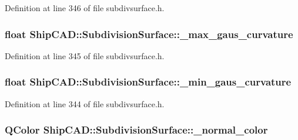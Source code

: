Definition at line 346 of file subdivsurface.\-h.

\hypertarget{classShipCAD_1_1SubdivisionSurface_a1658374385131656d359ff373d2cb08c}{
\subsubsection[{\-\_\-max\-\_\-gaus\-\_\-curvature}]{\setlength{\rightskip}{0pt plus 5cm}float Ship\-C\-A\-D\-::\-Subdivision\-Surface\-::\-\_\-max\-\_\-gaus\-\_\-curvature\hspace{0.3cm}{\ttfamily [protected]}}}\label{classShipCAD_1_1SubdivisionSurface_a1658374385131656d359ff373d2cb08c}


Definition at line 345 of file subdivsurface.\-h.

\hypertarget{classShipCAD_1_1SubdivisionSurface_ac343c30f7e4e6a5926fdfed7da3f9385}{
\subsubsection[{\-\_\-min\-\_\-gaus\-\_\-curvature}]{\setlength{\rightskip}{0pt plus 5cm}float Ship\-C\-A\-D\-::\-Subdivision\-Surface\-::\-\_\-min\-\_\-gaus\-\_\-curvature\hspace{0.3cm}{\ttfamily [protected]}}}\label{classShipCAD_1_1SubdivisionSurface_ac343c30f7e4e6a5926fdfed7da3f9385}


Definition at line 344 of file subdivsurface.\-h.

\hypertarget{classShipCAD_1_1SubdivisionSurface_a62cbe24451a794c0da3660ed0f1066ca}{
\subsubsection[{\-\_\-normal\-\_\-color}]{\setlength{\rightskip}{0pt plus 5cm}Q\-Color Ship\-C\-A\-D\-::\-Subdivision\-Surface\-::\-\_\-normal\-\_\-color\hspace{0.3cm}{\ttfamily [protected]}}}\label{classShipCAD_1_1SubdivisionSurface_a62cbe24451a794c0da3660ed0f1066ca}


